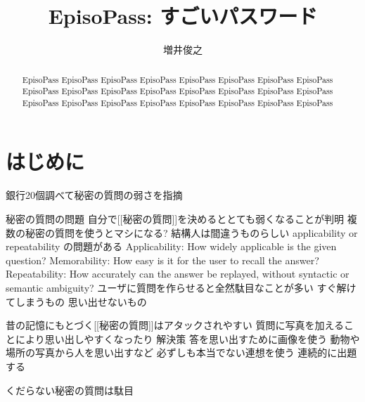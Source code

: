 \documentclass[twoside]{wiss}
\begin{document}

\title{EpisoPass: すごいパスワード}

\author{増井俊之}

\begin{abstract}
EpisoPass EpisoPass EpisoPass EpisoPass EpisoPass EpisoPass 
EpisoPass EpisoPass EpisoPass EpisoPass EpisoPass EpisoPass 
EpisoPass EpisoPass EpisoPass EpisoPass EpisoPass EpisoPass 
EpisoPass EpisoPass EpisoPass EpisoPass EpisoPass EpisoPass 
\end{abstract}

\maketitle

\section{はじめに}

 銀行20個調べて秘密の質問の弱さを指摘
\cite{Rabkin:2008:PKQ:1408664.1408667}

 秘密の質問の問題
  自分で[[秘密の質問]]を決めるととても弱くなることが判明
  複数の秘密の質問を使うとマシになる?
  結構人は間違うものらしい
 applicability or repeatability の問題がある
  Applicability: How widely applicable is the given question?
  Memorability: How easy is it for the user to recall the answer?
  Repeatability: How accurately can the answer be replayed, without syntactic or semantic ambiguity?
 ユーザに質問を作らせると全然駄目なことが多い
  すぐ解けてしまうもの
  思い出せないもの
\cite{Just:2009:PCC:1572532.1572543}

 昔の記憶にもとづく[[秘密の質問]]はアタックされやすい
 質問に写真を加えることにより思い出しやすくなったり
 解決策
  答を思い出すために画像を使う
   動物や場所の写真から人を思い出すなど
  必ずしも本当でない連想を使う
  連続的に出題する
\cite{Renaud:2010:PQE:2146303.2146318}

くだらない秘密の質問は駄目\cite{Schechter:2009:NSM:1607723.1608145}



\end{document}
